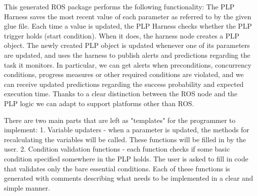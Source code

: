 \documentclass[ 5p, 12pt, times, twocolumn, sort&compress ]{elsarticle}
\begin{document}
This generated ROS package performs the following functionality: The PLP Harness saves the most recent value of each parameter as referred to by the given glue file. Each time a value is updated, the PLP Harness checks whether the PLP trigger holds (start condition). When it does, the harness node creates a PLP object. The newly created PLP object is updated whenever one of its parameters are updated, and uses the harness to publish alerts and predictions regarding the task it monitors. In particular, we can get alerts when preconditions, concurrency conditions, progress measures or other required conditions are violated, and we can receive updated predictions regarding the success probability and expected execution time. 
Thanks to a clear distinction between the ROS node and the PLP logic we can adapt to support platforms other than ROS.

There are two main parts that are left as "templates" for the programmer to implement: 1. Variable updaters - when a parameter is updated, the methods for recalculating the variables will be called. These functions will be filled in by the user. 2. Condition validation functions - each function checks if some basic condition specified somewhere in the PLP holds. The user is asked to fill in code that validates only the bare essential conditions.
Each of these functions is generated with comments describing what needs to be implemented in a clear and simple manner.



\end{document}

